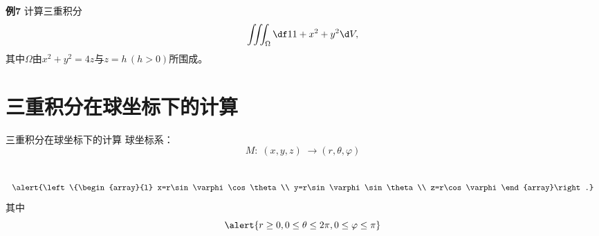 \begin{frame}
	\linespread{1.2}
	\begin{exampleblock}{{\bf 例7}\hfill}
		计算三重积分
		$$\iiint_{\Omega}\df 1{1+x^2+y^2}\d V,$$
		其中$\Omega$由$x^2+y^2=4z$与$z=h\,(h>0)$所围成。
	\end{exampleblock}
\end{frame}

\section{三重积分在球坐标下的计算}

\begin{frame}{三重积分在球坐标下的计算}
	\linespread{1.2}\pause 
	{\bb 球坐标系：}
	$$M:\;(x,y,z)\;\to(r,\theta,\varphi)$$
	\vspace{-2em}
	\begin{columns}\pause 
			$$\alert{\left\{\begin{array}{l}
				x=r\sin\varphi\cos\theta\\
				y=r\sin\varphi\sin\theta\\
				z=r\cos\varphi
			\end{array}\right.}$$
			\pause 其中
			$$\alert{r\geq 0,0\leq\theta\leq 2\pi,0\leq\varphi\leq\pi}$$
		\pause 
			\begin{center}
			\end{center}
	\end{columns}
\end{frame}


